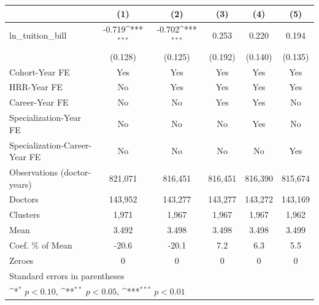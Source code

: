 {
\def\sym#1{\ifmmode^{#1}\else\(^{#1}\)\fi}
\begin{tabular}{l*{5}{c}}
\hline\hline
                    &\multicolumn{1}{c}{(1)}         &\multicolumn{1}{c}{(2)}         &\multicolumn{1}{c}{(3)}         &\multicolumn{1}{c}{(4)}         &\multicolumn{1}{c}{(5)}         \\
\hline
ln\_tuition\_bill     &      -0.719\sym{***}&      -0.702\sym{***}&       0.253         &       0.220         &       0.194         \\
                    &     (0.128)         &     (0.125)         &     (0.192)         &     (0.140)         &     (0.135)         \\
[1em]
Cohort-Year FE      &         Yes         &         Yes         &         Yes         &         Yes         &         Yes         \\
[1em]
HRR-Year FE         &          No         &         Yes         &         Yes         &         Yes         &         Yes         \\
[1em]
Career-Year FE      &          No         &          No         &         Yes         &         Yes         &          No         \\
[1em]
Specialization-Year FE&          No         &          No         &          No         &         Yes         &          No         \\
[1em]
Specialization-Career-Year FE&          No         &          No         &          No         &          No         &         Yes         \\
\hline
Observations (doctor-years)&     821,071         &     816,451         &     816,451         &     816,390         &     815,674         \\
Doctors             &     143,952         &     143,277         &     143,277         &     143,272         &     143,169         \\
Clusters            &       1,971         &       1,967         &       1,967         &       1,967         &       1,962         \\
Mean                &       3.492         &       3.498         &       3.498         &       3.498         &       3.499         \\
Coef. \% of Mean    &       -20.6         &       -20.1         &         7.2         &         6.3         &         5.5         \\
Zeroes              &           0         &           0         &           0         &           0         &           0         \\
\hline\hline
\multicolumn{6}{l}{\footnotesize Standard errors in parentheses}\\
\multicolumn{6}{l}{\footnotesize \sym{*} \(p<0.10\), \sym{**} \(p<0.05\), \sym{***} \(p<0.01\)}\\
\end{tabular}
}
